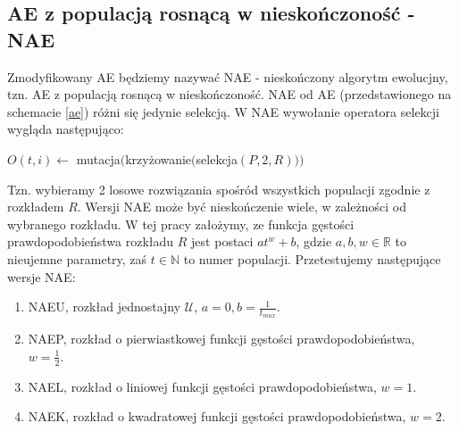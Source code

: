 \documentclass[12pt, a4paper]{article}
\begin{document}
\subsection{AE z populacją rosnącą w nieskończoność - NAE}

Zmodyfikowany AE będziemy nazywać NAE - nieskończony algorytm ewolucjny, tzn. AE z populacją rosnącą w nieskończoność.
NAE od AE (przedstawionego na schemacie \ref{ae}) różni się jedynie selekcją. W NAE wywołanie operatora selekcji wygląda następująco:

\begin{algorithm}[!htb]
\begin{algorithmic}[1] 
\State $O(t,i) \gets$ mutacja$($krzy{\.z}owanie$($selekcja$(P, 2, R)))$  
\end{algorithmic}
\end{algorithm}

Tzn. wybieramy 2 losowe rozwiązania spośród wszystkich populacji zgodnie z rozkładem $R$.
Wersji NAE może być nieskończenie wiele, w zależności od wybranego rozkładu. 
W tej pracy założymy, ze funkcja gęstości prawdopodobieństwa rozkładu $R$ jest postaci $at^w + b$, gdzie
$a, b, w \in \mathbb{R}$ to nieujemne parametry, zaś $t \in \mathbb{N}$ to numer populacji. Przetestujemy następujące wersje NAE:

\begin{enumerate}
 \item NAEU, rozkład jednostajny $\mathcal{U}$, $a=0, b=\frac{1}{t_{max}}$.
 \item NAEP, rozkład o pierwiastkowej funkcji gęstości prawdopodobieństwa, \\$w=\frac{1}{2}$.
 \item NAEL, rozkład o liniowej funkcji gęstości prawdopodobieństwa, $w=1$.
 \item NAEK, rozkład o kwadratowej funkcji gęstości prawdopodobieństwa, $w=2$.
\end{enumerate}


\nocite{*}


\end{document}
